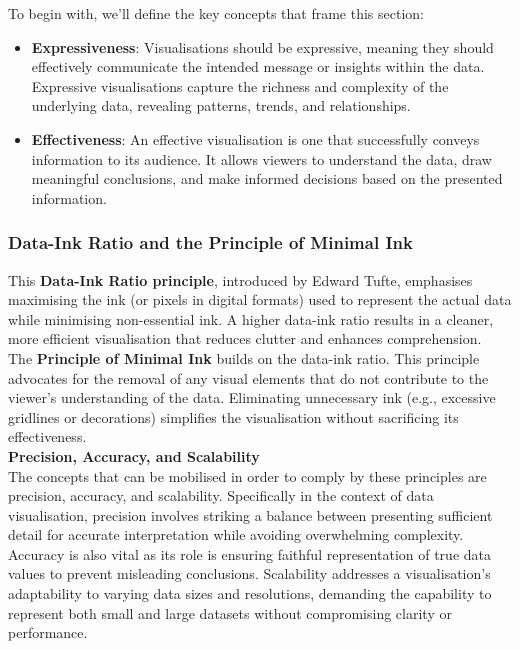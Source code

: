 \documentclass{article}\usepackage[]{graphicx}\usepackage[]{xcolor}
\begin{document}
To begin with, we'll define the key concepts that frame this section:
\begin{itemize}
    \item \textbf{Expressiveness}: Visualisations should be expressive, meaning they should effectively communicate the intended message or insights within the data. Expressive visualisations capture the richness and complexity of the underlying data, revealing patterns, trends, and relationships.
    \item \textbf{Effectiveness}: An effective visualisation is one that successfully conveys information to its audience. It allows viewers to understand the data, draw meaningful conclusions, and make informed decisions based on the presented information.
\end{itemize}

\subsubsection{Data-Ink Ratio and the Principle of Minimal Ink} 
This \textbf{Data-Ink Ratio principle}, introduced by Edward Tufte, emphasises maximising the ink (or pixels in digital formats) used to represent the actual data while minimising non-essential ink. A higher data-ink ratio results in a cleaner, more efficient visualisation that reduces clutter and enhances comprehension.\\
The \textbf{Principle of Minimal Ink} builds on the data-ink ratio. This principle advocates for the removal of any visual elements that do not contribute to the viewer's understanding of the data. Eliminating unnecessary ink (e.g., excessive gridlines or decorations) simplifies the visualisation without sacrificing its effectiveness.\\

\noindent \textbf{Precision, Accuracy, and Scalability}\\
The concepts that can be mobilised in order to comply by these principles are precision, accuracy, and scalability. Specifically in the context of data visualisation, precision involves striking a balance between presenting sufficient detail for accurate interpretation while avoiding overwhelming complexity. Accuracy is also vital as its role is ensuring faithful representation of true data values to prevent misleading conclusions. Scalability addresses a visualisation's adaptability to varying data sizes and resolutions, demanding the capability to represent both small and large datasets without compromising clarity or performance.
\end{document}
